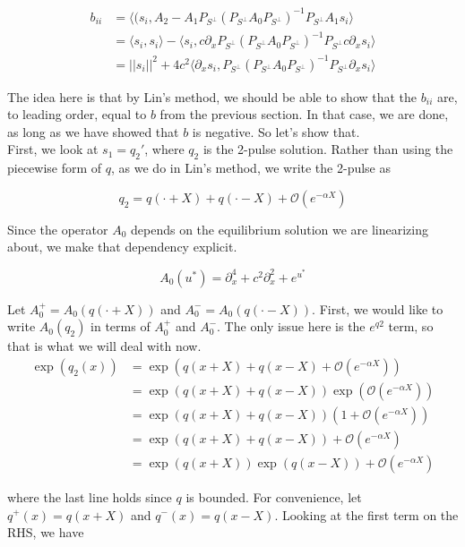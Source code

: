 \documentclass[12pt]{article}
\begin{document}
\begin{align*}
b_{ii} &= \langle(s_i, A_2 - A_1 P_{S^\perp} (P_{S^\perp} A_0 P_{S^\perp})^{-1} P_{S^\perp} A_1 s_i \rangle \\
&= \langle s_i, s_i \rangle - \langle s_i, c \partial_x P_{S^\perp} (P_{S^\perp} A_0 P_{S^\perp})^{-1} P_{S^\perp} c \partial_x  s_i \rangle \\
&= ||s_i||^2 + 4 c^2 \langle \partial_x s_i, P_{S^\perp} (P_{S^\perp} A_0 P_{S^\perp})^{-1} P_{S^\perp} \partial_x s_i \rangle
\end{align*}

The idea here is that by Lin's method, we should be able to show that the $b_{ii}$ are, to leading order, equal to $b$ from the previous section. In that case, we are done, as long as we have showed that $b$ is negative. So let's show that.\\

First, we look at $s_1 = q_2'$, where $q_2$ is the 2-pulse solution. Rather than using the piecewise form of $q$, as we do in Lin's method, we write the 2-pulse as

\[
q_2 = q(\cdot + X) + q(\cdot - X) + \mathcal{O}(e^{-\alpha X})
\]

Since the operator $A_0$ depends on the equilibrium solution we are linearizing about, we make that dependency explicit.

\begin{equation}
A_0(u^*) = \partial_x^4 + c^2 \partial_x^2 + e^{u^*}
\end{equation}

Let $A_0^+ = A_0(q(\cdot + X))$ and $A_0^- = A_0(q(\cdot - X))$. First, we would like to write $A_0(q_2)$ in terms of $A_0^+$ and $A_0^-$. The only issue here is the $e^{q2}$ term, so that is what we will deal with now.\\

\begin{align*}
\exp(q_2(x)) &= \exp( q(x + X) + q(x - X) + \mathcal{O}(e^{-\alpha X}) ) \\
&= \exp( q(x + X) + q(x - X)) \exp( \mathcal{O}(e^{-\alpha X}) )\\
&= \exp( q(x + X) + q(x - X)) (1 + \mathcal{O}(e^{-\alpha X})) \\
&= \exp( q(x + X) + q(x - X)) + \mathcal{O}(e^{-\alpha X}) \\
&= \exp( q(x + X))\exp(q(x - X)) + \mathcal{O}(e^{-\alpha X})
\end{align*}

where the last line holds since $q$ is bounded. For convenience, let $q^+(x) = q(x + X)$ and $q^-(x) = q(x - X)$. Looking at the first term on the RHS, we have
\end{document}
